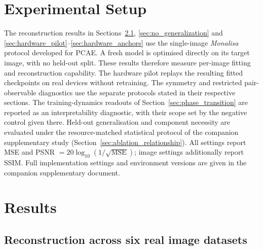 \documentclass[pdflatex,sn-basic]{sn-jnl}
\begin{document}
\section{Experimental Setup}
\label{sec:protocol}

The reconstruction results in
Sections~\ref{sec:sameset_results}, \ref{sec:no_generalization} and
\ref{sec:hardware_pilot}--\ref{sec:hardware_anchors} use the single-image
\textit{Monalisa} protocol developed for PCAE. A fresh model is optimised
directly on its target image, with no held-out split. These results therefore measure
per-image fitting and reconstruction capability. The hardware pilot replays the
resulting fitted checkpoints on real devices without retraining. The symmetry
and restricted pair-observable diagnostics use the separate protocols stated in
their respective sections. The training-dynamics
readouts of Section~\ref{sec:phase_transition} are reported as an
interpretability diagnostic, with their scope set by the negative control given
there. Held-out generalisation and component necessity are evaluated under the
resource-matched statistical protocol of the companion supplementary study
(Section~\ref{sec:ablation_relationship}). All settings report MSE and
PSNR $=20\log_{10}(1/\sqrt{\mathrm{MSE}})$; image settings
additionally report SSIM. Full implementation settings and environment versions
are given in the companion supplementary document.

\section{Results}
\label{sec:results}

\subsection{Reconstruction across six real image datasets}
\label{sec:sameset_results}
\end{document}
